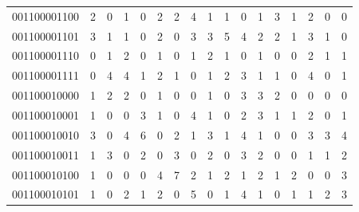 \documentclass[10pt,a4paper]{article}
\begin{document}
\begin{longtable}{ |c|c|c|c|c|c|c|c|c|c|c|c|c|c|c|c|c| }
    001100001100              & 2                            & 0                                & 1                            & 0                              & 2   & 2   & 4   & 1   & 1   & 0   & 1   & 3   & 1   & 2   & 0   & 0   \\
    001100001101              & 3                            & 1                                & 1                            & 0                              & 2   & 0   & 3   & 3   & 5   & 4   & 2   & 2   & 1   & 3   & 1   & 0   \\
    001100001110              & 0                            & 1                                & 2                            & 0                              & 1   & 0   & 1   & 2   & 1   & 0   & 1   & 0   & 0   & 2   & 1   & 1   \\
    001100001111              & 0                            & 4                                & 4                            & 1                              & 2   & 1   & 0   & 1   & 2   & 3   & 1   & 1   & 0   & 4   & 0   & 1   \\
    001100010000              & 1                            & 2                                & 2                            & 0                              & 1   & 0   & 0   & 1   & 0   & 3   & 3   & 2   & 0   & 0   & 0   & 0   \\
    001100010001              & 1                            & 0                                & 0                            & 3                              & 1   & 0   & 4   & 1   & 0   & 2   & 3   & 1   & 1   & 2   & 0   & 1   \\
    001100010010              & 3                            & 0                                & 4                            & 6                              & 0   & 2   & 1   & 3   & 1   & 4   & 1   & 0   & 0   & 3   & 3   & 4   \\
    001100010011              & 1                            & 3                                & 0                            & 2                              & 0   & 3   & 0   & 2   & 0   & 3   & 2   & 0   & 0   & 1   & 1   & 2   \\
    001100010100              & 1                            & 0                                & 0                            & 0                              & 4   & 7   & 2   & 1   & 2   & 1   & 2   & 1   & 2   & 0   & 0   & 3   \\
    001100010101              & 1                            & 0                                & 2                            & 1                              & 2   & 0   & 5   & 0   & 1   & 4   & 1   & 0   & 1   & 1   & 2   & 3   \\

\end{longtable}
\end{document}
